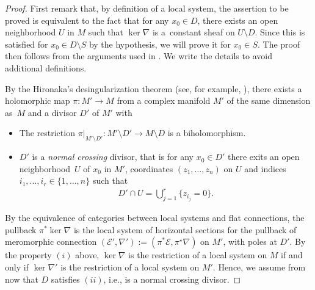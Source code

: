 \documentclass[pdftex]{sigma}
\numberwithin{equation}{section}
\begin{document}
\begin{proof} First remark that, by definition of a local system, the assertion to be proved is equivalent to the fact that for any $x_0\in D$, there exists an open neighborhood $U$ in $M$ such that $\ker  \nabla$ is a~constant sheaf on $U\setminus D$. Since this is satisfied for $x_0 \in D\setminus S$ by the hypothesis, we will prove it for $x_0\in S$. The proof then follows from the arguments used in \cite[Chapter~II, Theorems~5.2 and~5.4]{Deligne}. We write the details to avoid additional definitions.

By the Hironaka's desingularization theorem (see, for example, \cite[Theorem 7.13]{GrauertPeternellRemmert}), there exists a holomorphic map $\pi\colon M'\longrightarrow M$ from a complex manifold $M'$ of the same dimension as~$M$ and a divisor $D'$ of $M'$ with
\begin{itemize}\itemsep=0pt
 \item[(i)] The restriction $\pi|_{M'\setminus D'}\colon M'\setminus D' \longrightarrow M\setminus D$ is a biholomorphism.
 \item[(ii)] $D'$ is a \textit{normal crossing} divisor, that is for any $x_0\in D'$ there exits an open neighborhood~$U$ of $x_0$ in $M'$, coordinates $(z_1,\dots,z_n)$ on $U$ and indices $i_1,\dots,i_r\in \{1,\dots,n\}$ such that
 \begin{gather*}%
 D'\cap U= \bigcup_{j=1}^{r} \{z_{i_j}=0\}.\end{gather*}
\end{itemize}

By the equivalence of categories between local systems and flat connections, the pullback $\pi^* \ker  \nabla$ is the local system of horizontal sections for the pullback of meromorphic connection $(\mathcal{E}',\nabla'):=(\pi^* \mathcal{E},\pi^\star \nabla)$ on $M'$, with poles at $D'$. By the property $(i)$ above, $\ker  \nabla$ is the restriction of a local system on $M$ if and only if $\ker  \nabla'$ is the restriction of a local system on $M'$. Hence, we assume from now that $D$ satisfies $(ii)$, i.e., is a normal crossing divisor.


\end{proof}
\end{document}
